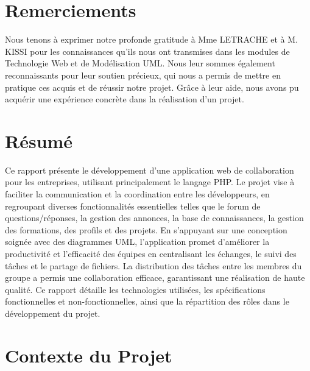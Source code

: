 \documentclass{article}
\begin{document}
    \setcounter{page}{2} 
    \tableofcontents
    \newpage

    \listoffigures

    \listoftables
    \newpage

    \section{Remerciements}
        Nous tenons à exprimer notre profonde gratitude à Mme LETRACHE et à M. KISSI pour les connaissances qu'ils nous ont transmises dans les modules de Technologie Web et de Modélisation UML. Nous leur sommes également reconnaissants pour leur soutien précieux, qui nous a permis de mettre en pratique ces acquis et de réussir notre projet. Grâce à leur aide, nous avons pu acquérir une expérience concrète dans la réalisation d'un projet.
    
    \newpage
    
    \section{Résumé}
        Ce rapport présente le développement d'une application web de collaboration pour les entreprises, utilisant principalement le langage PHP. 
        Le projet vise à faciliter la communication et la coordination entre les développeurs, en regroupant diverses fonctionnalités essentielles telles que le forum de questions/réponses, 
        la gestion des annonces, la base de connaissances, la gestion des formations, des profils et des projets. En s'appuyant sur une conception soignée avec des diagrammes UML, 
        l'application promet d'améliorer la productivité et l'efficacité des équipes en centralisant les échanges, le suivi des tâches et le partage de fichiers. 
        La distribution des tâches entre les membres du groupe a permis une collaboration efficace, garantissant une réalisation de haute qualité. 
        Ce rapport détaille les technologies utilisées, les spécifications fonctionnelles et non-fonctionnelles, ainsi que la répartition des rôles dans le développement du projet.
    \newpage
    \section{Contexte du Projet}
\end{document}

